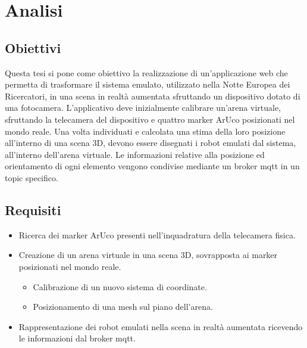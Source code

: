 \documentclass[12pt,a4paper,openright,oneside]{book}
\begin{document}
\chapter{Analisi}\label{chap:analisi} %
%
\section{Obiettivi}\label{sec:obiettivi} %
%
Questa tesi si pone come obiettivo la realizzazione di un'applicazione web che permetta di trasformare il sistema emulato, utilizzato nella Notte Europea dei Ricercatori, in una scena in realtà aumentata sfruttando un dispositivo dotato di una fotocamera.
L'applicativo deve inizialmente calibrare un'arena virtuale, sfruttando la telecamera del dispositivo e quattro marker ArUco posizionati nel mondo reale.
Una volta individuati e calcolata una stima della loro posizione all'interno di una scena 3D, devono essere disegnati i robot emulati dal sistema, all'interno dell'arena virtuale. Le informazioni relative alla posizione ed orientamento di ogni elemento vengono condivise mediante un broker \ac{mqtt} in un topic specifico.
%
%
\section{Requisiti}\label{sec:requisiti} %
%
\begin{itemize}
    \item Ricerca dei marker ArUco presenti nell'inquadratura della telecamera fisica.
    \item Creazione di un arena virtuale in una scena 3D, sovrapposta ai marker posizionati nel mondo reale.
    \begin{itemize}
        \item Calibrazione di un nuovo sistema di coordinate.
        \item Posizionamento di una mesh sul piano dell'arena.
    \end{itemize}
    \item Rappresentazione dei robot emulati nella scena in realtà aumentata ricevendo le informazioni dal broker \ac{mqtt}.
\end{itemize}
%
%
\end{document}
